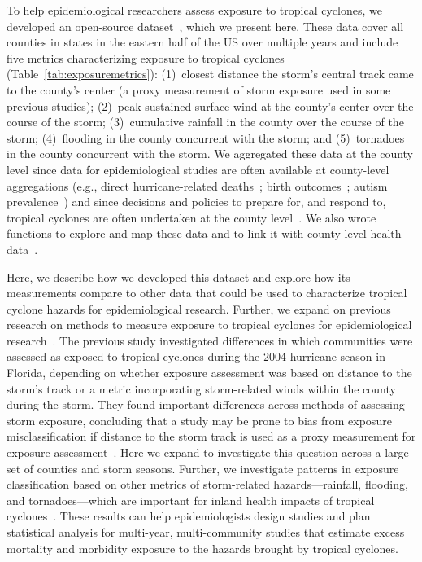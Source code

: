 To help epidemiological researchers assess exposure to tropical cyclones, we
developed an open-source dataset~\parencite{hurricaneexposure}, which we
present here.  These data cover all counties in states in the eastern half of
the \ac{US} over multiple years and include five metrics characterizing
exposure to tropical cyclones (Table~\ref{tab:exposuremetrics}): (1)~closest
distance the storm's central track came to the county's center (a proxy
measurement of storm exposure used in some previous studies); (2)~peak
sustained surface wind at the county's center over the course of the storm;
(3)~cumulative rainfall in the county over the course of the storm;
(4)~flooding in the county concurrent with the storm; and (5)~tornadoes in the
county concurrent with the storm.  We aggregated these data at the county level
since data for epidemiological studies are often available at county-level
aggregations (e.g., direct hurricane-related deaths~\parencite{czajkowski2011};
birth outcomes~\parencite{grabich2015, grabich2015measuring}; autism
prevalence~\parencite{kinney2008}) and since decisions and policies to prepare
for, and respond to, tropical cyclones are often undertaken at the county
level~\parencite{zandbergen2009, rappaport2000}.  We also wrote functions to
explore and map these data and to link it with county-level health
data~\parencite{hurricaneexposuredata}. 

Here, we describe how we developed this dataset and explore how its
measurements compare to other data that could be used to characterize tropical
cyclone hazards for epidemiological research. Further, we expand on previous
research on methods to measure exposure to tropical cyclones for
epidemiological research~\parencite{grabich2015measuring}.  The previous study
investigated differences in which communities were assessed as exposed to
tropical cyclones during the 2004 hurricane season in Florida, depending on
whether exposure assessment was based on distance to the storm's track or a
metric incorporating storm-related winds within the county during the storm.
They found important differences across methods of assessing storm exposure,
concluding that a study may be prone to bias from exposure misclassification if
distance to the storm track is used as a proxy measurement for exposure
assessment~\parencite{grabich2015measuring}.  Here we expand to investigate
this question across a large set of counties and storm seasons.  Further, we
investigate patterns in exposure classification based on other metrics of
storm-related hazards---rainfall, flooding, and tornadoes---which are important
for inland health impacts of tropical cyclones~\parencite{czajkowski2011,
moore2012}. These results can help epidemiologists design studies and plan
statistical analysis for multi-year, multi-community studies that estimate
excess mortality and morbidity exposure to the hazards brought by tropical
cyclones. 
